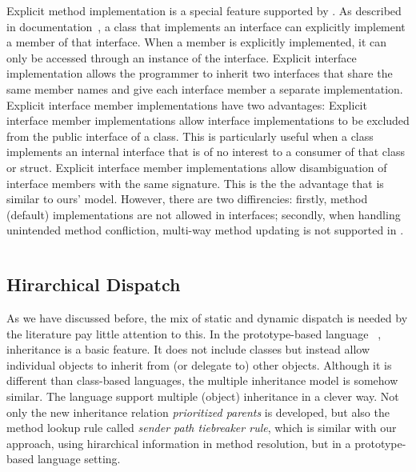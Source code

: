 \begin{lstlisting}
\end{lstlisting}

Explicit method implementation is a special feature supported by \csharp. As described in \csharp
documentation~\cite{csharpdoc}, a class that implements an interface can explicitly implement a member of that
interface. When a member is explicitly implemented, it can only be accessed through an instance
of the interface. Explicit interface implementation allows the programmer to inherit two interfaces 
that share the same member names and give each interface member a separate implementation. 
Explicit interface member implementations have two advantages:
Explicit interface member implementations allow interface implementations to be excluded 
from the public interface of a class. This is particularly useful when a class implements an internal 
interface that is of no interest to a consumer of that class or struct.
Explicit interface member implementations allow disambiguation of interface members with the 
same signature. This is the the advantage that is similar to ours' model. However, there are two 
diffirencies: firstly, method (default) implementations are not allowed in \csharp interfaces; 
secondly, when handling unintended method confliction, multi-way method updating is not supported 
in \csharp.

\begin{lstlisting}
\end{lstlisting}

\subsection{Hirarchical Dispatch}
As we have discussed before, the mix of static and dynamic dispatch is needed by the literature 
pay little attention to this. In the prototype-based language \self~\cite{Chambers1991}, inheritance is a basic feature.
It does not include classes but instead allow individual objects to inherit from (or delegate to) other objects. 
Although it is different than class-based languages, the multiple inheritance model is somehow similar. The \self 
language support multiple (object) inheritance in a clever way. Not only the new inheritance
relation \emph{prioritized parents} is developed, but also the method lookup rule called 
\emph{sender path tiebreaker rule}, which is similar with our approach, using hirarchical 
information in method resolution, but in a prototype-based language setting.


